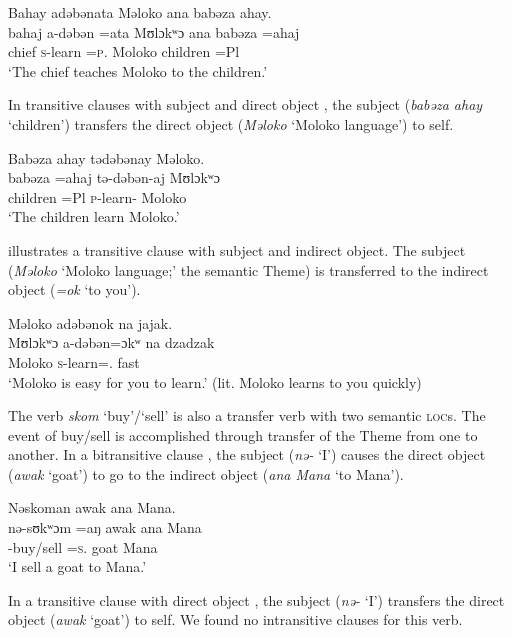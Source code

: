 \ea \label{ex:9:37}
Bahay  adəbənata  Məloko  ana  babəza  ahay. \\
\gll  bahaj a-dəbən =ata   Mʊlɔkʷɔ    ana   babəza     =ahaj \\
      chief  \textsc{s}-learn =\textsc{p}.{\IO}  Moloko    {\DAT} children    =Pl\\
\glt  ‘The chief teaches Moloko to the children.’ 
\z

In transitive clauses with subject and direct object , the subject (\textit{babəza ahay} ‘children’) transfers the direct object (\textit{Məloko} ‘Moloko language’) to self. 

\ea \label{ex:9:38}
Babəza  ahay  tədəbənay  Məloko.\\
\gll  babəza   =ahaj   tə-dəbən-aj   Mʊlɔkʷɔ\\
      children  =Pl  \textsc{p}-learn{}-{\CL}  Moloko \\
\glt  ‘The children learn Moloko.’ 
\z

 illustrates a transitive clause with subject and indirect object.  The subject (\textit{Məloko} ‘Moloko language;’ the semantic Theme) is transferred to the indirect object (\textit{=ok}  ‘to you’).  

\ea \label{ex:9:39}
Məloko  adəbənok  na  jajak.\\
\gll  Mʊlɔkʷɔ  a-dəbən=ɔkʷ  na  dzadzak\\
      Moloko  \textsc{s}-learn={\twoS}.{\IO}  \textsc{{\PSP}}  fast\\
\glt  ‘Moloko is easy for you to learn.’ (lit. Moloko learns to you quickly)
\z

The verb \textit{skom} ‘buy’/‘sell’ is also a transfer verb with two semantic {\scshape loc}s. The event of buy/sell is accomplished through transfer of the Theme from one \LOC to another. In a bitransitive clause , the subject (\textit{nə-}  ‘I’) causes the direct object (\textit{awak} ‘goat’) to go to the indirect object (\textit{ana Mana} ‘to Mana’). 

\ea \label{ex:9:40}
Nəskoman  awak  ana  Mana.\\
\gll  nə-sʊkʷɔm =aŋ     awak   ana   Mana\\
      {\oneS}-buy/sell  =\textsc{s}.{\IO}    goat  {\DAT} Mana\\
\glt   ‘I sell a goat to Mana.’ 
\z

In a transitive clause with direct object , the subject (\textit{nə-} ‘I’) transfers the direct object (\textit{awak} ‘goat’) to self. We found no intransitive clauses for this verb.

